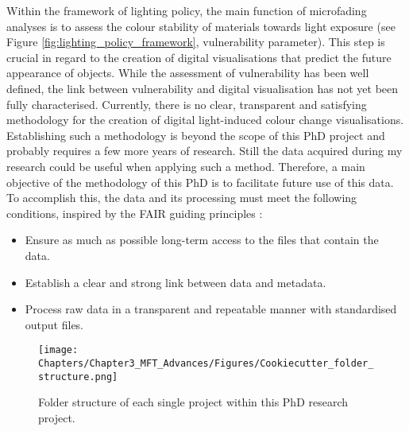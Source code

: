 Within the framework of lighting policy, the main function of microfading analyses is to assess the colour stability of materials towards light exposure (see Figure \ref{fig:lighting_policy_framework}, vulnerability parameter). This step is crucial in regard to the creation of digital visualisations that predict the future appearance of objects. While the assessment of vulnerability has been well defined, the link between vulnerability and digital visualisation has not yet been fully characterised. Currently, there is no clear, transparent and satisfying methodology for the creation of digital light-induced colour change visualisations. Establishing such a methodology is beyond the scope of this PhD project and probably requires a few more years of research. Still the data acquired during my research could be useful when applying such a method. Therefore, a main objective of the methodology of this PhD is to facilitate future use of this data. To accomplish this, the data and its processing must meet the following conditions, inspired by the FAIR guiding principles \citep{wilkinson_fair_2016}:\\

\begin{itemize}
    \item Ensure as much as possible long-term access to the files that contain the data.
    \item Establish a clear and strong link between data and metadata.
    \item Process raw data in a transparent and repeatable manner with standardised output files.
\end{itemize}

\begin{figure*}
\centering
\texttt{[image: Chapters/Chapter3\_MFT\_Advances/Figures/Cookiecutter\_folder\_structure.png]}
\caption[\hspace{0.3cm}Folder structure]{Folder structure of each single project within this PhD research project.}
\label{fig:folder_structure}
\end{figure*}

